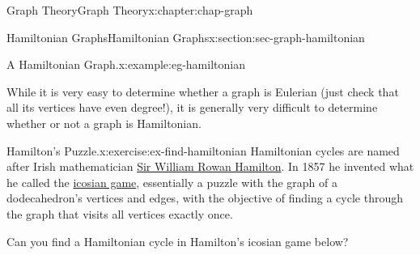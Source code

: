 \documentclass[oneside,10pt,]{book}
\numberwithin{equation}{section}
\begin{document}
\begin{chapterptx}{Graph Theory}{}{Graph Theory}{}{}{x:chapter:chap-graph}
\begin{sectionptx}{Hamiltonian Graphs}{}{Hamiltonian Graphs}{}{}{x:section:sec-graph-hamiltonian}
\begin{example}{A Hamiltonian Graph.}{x:example:eg-hamiltonian}
\begin{sidebyside}{1}{0.4}{0.4}{0}
\begin{sbspanel}{0.2}
{
}%
\end{sbspanel}%
\end{sidebyside}%
\end{example}
While it is very easy to determine whether a graph is Eulerian (just check that all its vertices have even degree!), it is generally very difficult to determine whether or not a graph is Hamiltonian.%
\begin{inlineexercise}{Hamilton's Puzzle.}{x:exercise:ex-find-hamiltonian}%
Hamiltonian cycles are named after Irish mathematician \href{https://en.wikipedia.org/wiki/William_Rowan_Hamilton}{Sir William Rowan Hamilton}. In 1857 he invented what he called the \href{https://en.wikipedia.org/wiki/Icosian_game}{icosian game}, essentially a puzzle with the graph of a dodecahedron's vertices and edges, with the objective of finding a cycle through the graph that visits all vertices exactly once.%
\par
Can you find a Hamiltonian cycle in Hamilton's icosian game below?%
\begin{sidebyside}{1}{0.375}{0.375}{0}%
\begin{sbspanel}{0.25}%
\end{sbspanel}
\end{sidebyside}
\end{inlineexercise}
\end{sectionptx}
\end{chapterptx}
\end{document}
